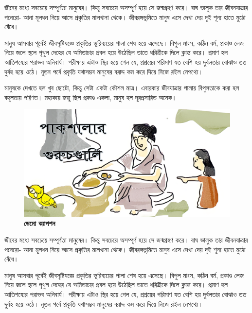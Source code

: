 জীবের মধ্যে সবচেয়ে সম্পূর্ণতা মানুষের। কিন্তু সবচেয়ে অসম্পূর্ণ হয়ে সে জন্মগ্রহণ করে। বাঘ ভালুক তার জীবনযাত্রার পনেরো- আনা মূলধন নিয়ে আসে প্রকৃতির মালখানা থেকে। জীবরঙ্গভূমিতে মানুষ এসে দেখা দেয় দুই শূন্য হাতে মুঠো বেঁধে।

মানুষ আসবার পূর্বেই জীবসৃষ্টিযজ্ঞে প্রকৃতির ভূরিব্যয়ের পালা শেষ হয়ে এসেছে। বিপুল মাংস, কঠিন বর্ম, প্রকাণ্ড লেজ নিয়ে জলে স্থলে পৃথুল দেহের যে অমিতাচার প্রবল হয়ে উঠেছিল তাতে ধরিত্রীকে দিলে ক্লান্ত করে। প্রমাণ হল আতিশয্যের পরাভব অনিবার্য। পরীক্ষায় এটাও স্থির হয়ে গেল যে, প্রশ্রয়ের পরিমাণ যত বেশি হয় দুর্বলতার বোঝাও তত দুর্বহ হয়ে ওঠে। নূতন পর্বে প্রকৃতি যথাসম্ভব মানুষের বরাদ্দ কম করে দিয়ে নিজে রইল নেপথ্যে।

মানুষকে দেখতে হল খুব ছোটো, কিন্তু সেটা একটা কৌশল মাত্র। এবারকার জীবযাত্রার পালায় বিপুলতাকে করা হল বহুলতায় পরিণত। মহাকায় জন্তু ছিল প্রকাণ্ড একলা, মানুষ হল দূরপ্রসারিত অনেক।
\begin{figure}
	\centering
	\includegraphics[width=\linewidth]{Images/DemoPic1.png}
	\caption{\small \textbf{ডেমো ক্যাপশন}}
\end{figure}

জীবের মধ্যে সবচেয়ে সম্পূর্ণতা মানুষের। কিন্তু সবচেয়ে অসম্পূর্ণ হয়ে সে জন্মগ্রহণ করে। বাঘ ভালুক তার জীবনযাত্রার পনেরো- আনা মূলধন নিয়ে আসে প্রকৃতির মালখানা থেকে। জীবরঙ্গভূমিতে মানুষ এসে দেখা দেয় দুই শূন্য হাতে মুঠো বেঁধে।

মানুষ আসবার পূর্বেই জীবসৃষ্টিযজ্ঞে প্রকৃতির ভূরিব্যয়ের পালা শেষ হয়ে এসেছে। বিপুল মাংস, কঠিন বর্ম, প্রকাণ্ড লেজ নিয়ে জলে স্থলে পৃথুল দেহের যে অমিতাচার প্রবল হয়ে উঠেছিল তাতে ধরিত্রীকে দিলে ক্লান্ত করে। প্রমাণ হল আতিশয্যের পরাভব অনিবার্য। পরীক্ষায় এটাও স্থির হয়ে গেল যে, প্রশ্রয়ের পরিমাণ যত বেশি হয় দুর্বলতার বোঝাও তত দুর্বহ হয়ে ওঠে। নূতন পর্বে প্রকৃতি যথাসম্ভব মানুষের বরাদ্দ কম করে দিয়ে নিজে রইল নেপথ্যে।


